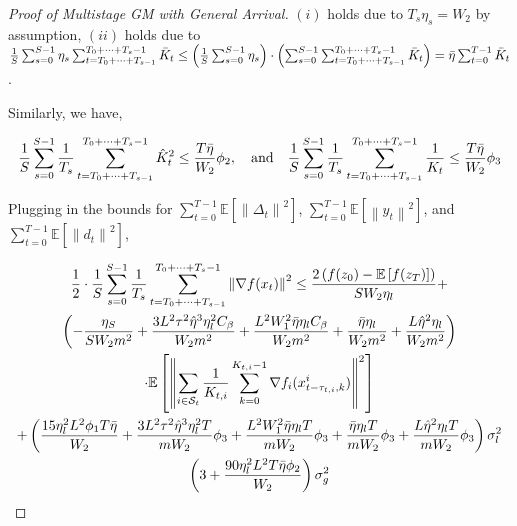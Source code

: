 \begin{proof}[Proof of Multistage GM with General Arrival]
$(i)$ holds due to $T_s\eta_s=W_2$ by assumption, $(ii)$ holds due to $\frac{1}{S}\sum_{s=0}^{S-1} \eta_s \sum_{t=T_0+\dots+T_{s-1} }^{T_0+\dots+T_s-1} \Bar{K}_t\leq\left(\frac{1}{S}\sum_{s=0}^{S-1} \eta_s\right)\cdot\left(\sum_{s=0}^{S-1}\sum_{t=T_0+\dots+T_{s-1} }^{T_0+\dots+T_s-1} \Bar{K}_t\right)=\Bar{\eta}\sum_{t=0}^{T-1}\Bar{K}_t$.

Similarly, we have,

\begin{equation}
\begin{gathered}
\frac{1}{S}\sum_{s=0}^{S-1} \frac{1}{T_s}\sum_{t=T_0+\dots+T_{s-1} }^{T_0+\dots+T_s-1} \hat{K}^2_t \leq \frac{T \Bar{\eta}}{W_2} \phi_2,  \quad \text{and} \quad
\frac{1}{S}\sum_{s=0}^{S-1} \frac{1}{T_s}\sum_{t=T_0+\dots+T_{s-1} }^{T_0+\dots+T_s-1} \frac{1}{K_t} \leq \frac{T \Bar{\eta}}{W_2} \phi_3
\end{gathered}\nonumber
\end{equation}




Plugging in the bounds for $\sum_{t=0}^{T-1}\mathbb{E}\left[\left\| \Delta_t\right\|^2\right]$, $\sum_{t=0}^{T-1}\mathbb{E}\left[\left\| y_t\right\|^2\right]$, and $\sum_{t=0}^{T-1}\mathbb{E}\left[\left\| d_t\right\|^2\right]$,

\begin{equation}
\begin{gathered}
\frac{1}{2} \cdot \frac{1}{S}\sum_{s=0}^{S-1} \frac{1}{T_s}\sum_{t=T_0+\dots+T_{s-1} }^{T_0+\dots+T_s-1} \left\|\nabla f(x_t)\right\|^2
\leq \frac{2\left(f(z_0) - \mathbb{E}\left[f(z_{T})\right]  \right)}{S W_2 \eta_l} + \\
\left( -\frac{\eta_S}{S W_2 m^2} + \frac{3 L^2 \tau^2 \hat{\eta}^3 \eta_l^2 C_\beta}{W_2 m^2} + \frac{L^2 W_1^2 \Bar{\eta} \eta_l C_\beta}{W_2 m^2} + \frac{\Bar{\eta}\eta_l}{W_2 m^2} + \frac{L\hat{\eta}^2\eta_l}{W_2 m^2} \right)\\
\cdot \mathbb{E}\left[\left\| \sum_{i\in\mathcal{S}_t} \frac{1}{K_{t,i}} \sum_{k=0}^{K_{t,i}-1} \nabla f_i(x_{t-\tau_{t,i},k}^i) \right\|^2\right]\\
+\left( \frac{15  \eta^2_l L^2 \phi_1 T \Bar{\eta}}{W_2}  + \frac{3 L^2 \tau^2 \hat{\eta}^3 \eta_l^2 T}{m W_2} \phi_3 + \frac{L^2W_1^2\Bar{\eta}\eta_l T}{m W_2} \phi_3 + \frac{\Bar{\eta}\eta_l T}{m W_2} \phi_3 + \frac{L \hat{\eta}^2 \eta_l T}{m W_2} \phi_3 \right)\sigma_l^2\\
\left(3 + \frac{90 \eta^2_l L^2 T \Bar{\eta}\phi_2 }{W_2}\right)\sigma_g^2
\end{gathered}\nonumber
\end{equation}


\end{proof}
